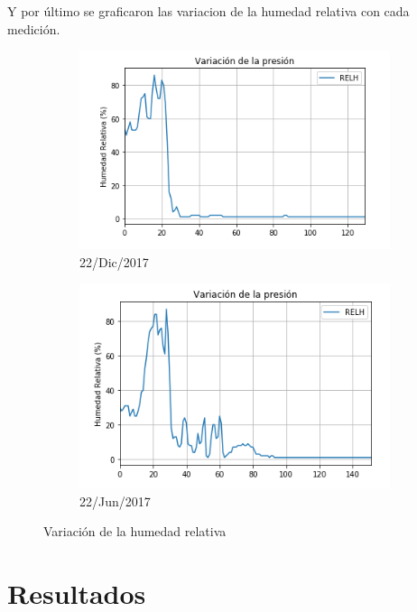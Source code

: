 \documentclass{article}
\begin{document}
Y por último se graficaron las variacion de la humedad relativa con cada medición.
\begin{figure}[h!]
	\begin{subfigure}[b]{0.5\linewidth}
    \raggedleft
	\includegraphics[height=0.15\textheight, width=\linewidth]{7thInstDec.png}
    \caption{22/Dic/2017}
	\end{subfigure}
	\begin{subfigure}[b]{0.5\linewidth}
    \raggedright
	\includegraphics[height=0.15\textheight, width=\linewidth]{7thInstJun.png}
    \caption{22/Jun/2017}
	\end{subfigure}
    \caption{Variación de la humedad relativa}
\end{figure}

\section{Resultados}
\end{document}
